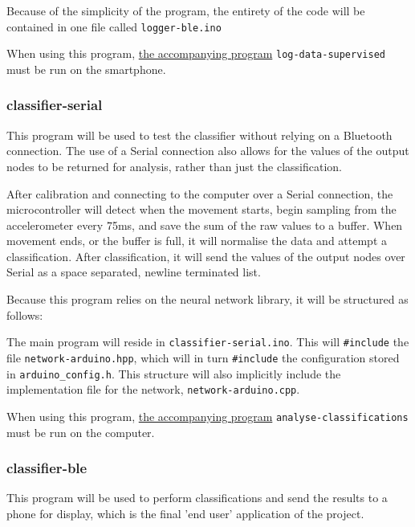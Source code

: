 \documentclass[a4paper]{article}
\begin{document}
Because of the simplicity of the program, the entirety of the code will be contained in one file called \lstinline{logger-ble.ino}

When using this program, \hyperref[subsubsec:dc_asa_logger]{the accompanying program} \lstinline{log-data-supervised} must be run on the smartphone.

\subsubsection{classifier-serial}
\label{subsubsec:dc_msa_classifierserial}

This program will be used to test the classifier without relying on a Bluetooth connection. The use of a Serial connection also allows for the values of the output nodes to be returned for analysis, rather than just the classification.

After calibration and connecting to the computer over a Serial connection, the microcontroller will detect when the movement starts, begin sampling from the accelerometer every 75ms, and save the sum of the raw values to a buffer. When movement ends, or the buffer is full, it will normalise the data and attempt a classification. After classification, it will send the values of the output nodes over Serial as a space separated, newline terminated list.

Because this program relies on the neural network library, it will be structured as follows:

The main program will reside in \lstinline{classifier-serial.ino}. This will \lstinline{#include} the file \lstinline{network-arduino.hpp}, which will in turn \lstinline{#include} the configuration stored in \lstinline{arduino_config.h}. 
This structure will also implicitly include the implementation file for the network, \lstinline{network-arduino.cpp}.


When using this program, \hyperref[subsubsec:dc_csa_analyse]{the accompanying program} \lstinline{analyse-classifications} must be run on the computer.

\subsubsection{classifier-ble}%
\label{subsubsec:dc_msa_classifierble}

This program will be used to perform classifications and send the results to a phone for display, which is the final 'end user' application of the project.
\end{document}
